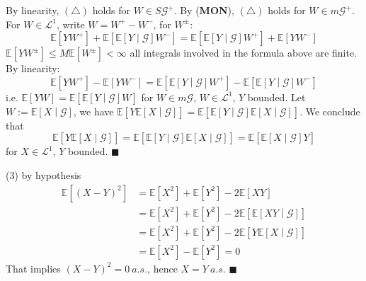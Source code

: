 \documentclass[a4paper,12pt,twoside]{book}
\begin{document}
\begin{itemize}
\begin{itemize}
	By linearity, $(\triangle)$ holds for $W\in S \mathcal{G}^+$. \newline
	By (\textbf{MON}), $(\triangle)$ holds for $W \in m \mathcal{G}^+$. \newline
	For $W\in \mathcal{L}^1$, write $W=W^+ - W^-$, for $W^{\pm}$:
	\begin{equation}
		\mathbb{E}\left[YW^+\right]+\mathbb{E}\left[\mathbb{E}\left[Y\middle|\mathcal{G}\right]W^-\right]=\mathbb{E}\left[\mathbb{E}\left[Y\middle|\mathcal{G}\right]W^+\right]+\mathbb{E}\left[YW^-\right]
	\end{equation}
	$\mathbb{E}\left[YW^{\pm}\right]\leq M \mathbb{E}\left[W^{\pm}\right]<\infty$ all integrals involved in the formula above are finite. By linearity:
	\begin{equation}
		\mathbb{E}\left[YW^+\right]-\mathbb{E}\left[YW^-\right]=\mathbb{E}\left[\mathbb{E}\left[Y\middle|\mathcal{G}\right]W^+\right]-\mathbb{E}\left[\mathbb{E}\left[Y\middle|\mathcal{G}\right]W^-\right]
	\end{equation}
	i.e. $\mathbb{E}\left[YW\right]=\mathbb{E}\left[\mathbb{E}\left[Y\middle|\mathcal{G}\right]W\right]$ for $W\in m \mathcal{G}$, $W\in \mathcal{L}^1$, $Y$ bounded. Let $W:=\mathbb{E}\left[X\middle|\mathcal{G}\right]$, we have $\mathbb{E}\left[Y \mathbb{E}\left[X\middle|\mathcal{G}\right]\right]=\mathbb{E}\left[\mathbb{E}\left[Y\middle|\mathcal{G}\right] \mathbb{E}\left[X\middle|\mathcal{G}\right]\right]$. We conclude that 
	\begin{equation}
		\mathbb{E}\left[Y \mathbb{E}\left[X\middle|\mathcal{G}\right]\right]=\mathbb{E}\left[\mathbb{E}\left[Y\middle|\mathcal{G}\right] \mathbb{E}\left[X\middle|\mathcal{G}\right]\right]=\mathbb{E}\left[\mathbb{E}\left[X\middle|\mathcal{G}\right]Y\right]
	\end{equation}
	for $X\in \mathcal{L}^1$, $Y$ bounded. $\blacksquare$

	(3) by hypothesis
	\begin{equation}
		\begin{split}
			\mathbb{E}\left[(X-Y)^2\right] &= \mathbb{E}\left[X^2\right]+\mathbb{E}\left[Y^2\right]-2 \mathbb{E}\left[XY\right]\\
			&= \mathbb{E}\left[X^2\right]+\mathbb{E}\left[Y^2\right]-2 \mathbb{E}\left[\mathbb{E}\left[XY\middle|\mathcal{G}\right]\right]\\
			&=\mathbb{E}\left[X^2\right]+\mathbb{E}\left[Y^2\right]-2 \mathbb{E}\left[Y\mathbb{E}\left[X\middle|\mathcal{G}\right]\right]\\
			&= \mathbb{E}\left[X^2\right]-\mathbb{E}\left[Y^2\right]=0
		\end{split}
	\end{equation}
	That implies $(X-Y)^2=0~a.s.$, hence $X=Y~a.s$. $\blacksquare$
\end{itemize}


\end{itemize}
\end{document}
